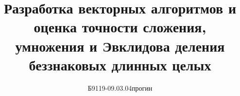 \documentclass[ {{barchelor thesis}}, draught ]{fefudoc}
\author{Б9119-09.03.04прогин}{Андреев Борис Викторович}
\title{Разработка векторных алгоритмов и оценка точности сложения, умножения и Эвклидова деления беззнаковых длинных целых}
\begin{document}
\frontpage
\signaturepage







\printbibliography
\tableofcontents
\appendix



\end{document}
